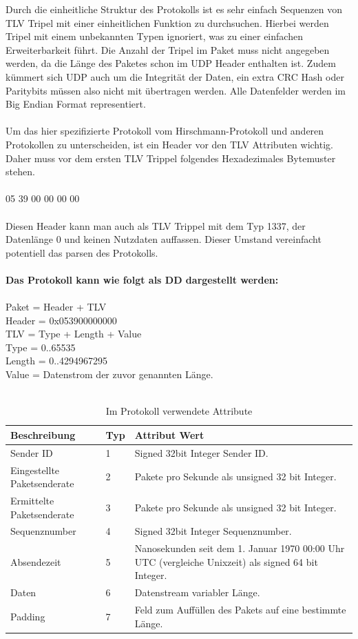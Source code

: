 Durch die einheitliche Struktur des Protokolls ist es sehr einfach Sequenzen von
TLV Tripel mit einer einheitlichen Funktion zu durchsuchen.
Hierbei werden Tripel mit einem unbekannten Typen ignoriert, was zu einer 
einfachen Erweiterbarkeit führt. Die Anzahl der Tripel im Paket muss nicht 
angegeben werden, da die Länge des Paketes schon im UDP Header enthalten ist.
Zudem kümmert sich UDP auch um die Integrität der Daten, ein extra CRC Hash oder
Paritybits müssen also nicht mit übertragen werden. Alle Datenfelder werden
im Big Endian Format representiert.
\\ \\
Um das hier spezifizierte Protokoll vom Hirschmann-Protokoll und anderen
Protokollen zu unterscheiden, ist ein Header vor den TLV Attributen wichtig. Daher muss vor dem ersten TLV Trippel 
folgendes Hexadezimales Bytemuster stehen.
\\ \\
05 39 00 00 00 00
\\ \\
Diesen Header kann man auch als TLV Trippel mit dem Typ 1337, der Datenlänge
0 und keinen Nutzdaten auffassen. Dieser Umstand vereinfacht potentiell das parsen des Protokolls.
\\ \\
\textbf{Das Protokoll kann wie folgt als DD dargestellt werden:} \\ \\
Paket = Header + {TLV} \\
Header = 0x053900000000 \\
TLV = Type + Length + Value  \\
Type = 0..65535  \\
Length = 0..4294967295 \\
Value = Datenstrom der zuvor genannten Länge. \\
\\ 
\begin{table}[htdp]
\centering
\caption{Im Protokoll verwendete Attribute}
\label{tab:prot}
\begin{tabular}{|l|l|p{9.5cm}|}
\hline
\textbf{Beschreibung} & \textbf{Typ} & \textbf{Attribut Wert} \\
\hline
Sender ID & 1 & Signed 32bit Integer Sender ID.\\
\hline
Eingestellte Paketsenderate & 2 & Pakete pro Sekunde als unsigned 32 bit Integer. \\
\hline
Ermittelte Paketsenderate & 3 & Pakete pro Sekunde als unsigned 32 bit Integer. \\
\hline
Sequenznumber & 4 & Signed 32bit Integer Sequenznumber. \\
\hline
Absendezeit & 5 & Nanosekunden seit dem 1. Januar 1970 00:00 Uhr UTC (vergleiche Unixzeit) als signed 64 bit Integer. \\
\hline
Daten & 6 & Datenstream variabler Länge. \\
\hline
Padding & 7 & Feld zum Auffüllen des Pakets auf eine bestimmte Länge. \\
\hline
\end{tabular}
\end{table}

